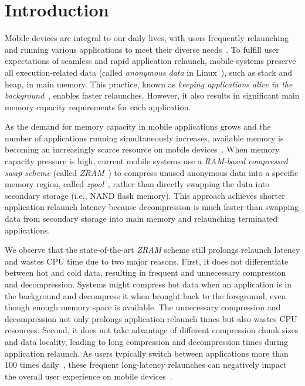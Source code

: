 \section{Introduction}
\label{sec:Intro}
Mobile devices are integral to our daily lives, with users frequently relaunching and running various applications to meet their diverse needs~\cite{lebeck2020end, low-end2, deng2019measuring}. To fulfill user expectations of seamless and rapid application relaunch, mobile systems preserve all execution-related data (called \emph{anonymous data} in Linux~\cite{anonymous}), such as stack and heap, in main memory. This practice, known as \emph{keeping applications alive in the background}~\cite{kim2019ezswap, bergman2022znswap, lebeck2020end, son2021asap, end2024more},
enables faster relaunches. However, it also results in significant main memory capacity requirements for each application. 

As the demand for memory capacity in mobile applications grows and the number of applications running simultaneously increases,  available memory is becoming an increasingly scarce resource on mobile devices~\cite{liang2020acclaim, son2021asap, end2024more, lebeck2020end}.
When memory capacity pressure is high, current mobile systems use a \emph{RAM-based compressed swap scheme} (called \emph{ZRAM}~\cite{zram1,zram2}) to compress unused anonymous data into a specific memory region, called \emph{zpool}~\cite{zpool}, rather than directly swapping the data into secondary storage (i.e., NAND flash memory). This approach achieves shorter application relaunch latency because decompression is much faster than swapping data from secondary storage into main memory and relaunching terminated applications.

We observe that the state-of-the-art \emph{ZRAM} scheme still prolongs relaunch latency and wastes CPU time due to two major reasons. First, it does not differentiate between hot and cold data, resulting in frequent and unnecessary compression and decompression. Systems might compress hot data when an application is in the background and decompress it when brought back to the foreground, even though enough memory space is available. The unnecessary compression and decompression not only prolongs application relaunch times but also wastes CPU resources. Second, it does not take advantage of different compression chunk sizes and data locality, leading to long compression and decompression times during application relaunch. As users typically switch between applications more than 100 times daily~\cite{deng2019measuring}, these frequent long-latency relaunches can negatively impact the overall user experience on mobile devices~\cite{predict1, predict2, predict3, context-aware, ubcomp6, ubcomp21, ubcomp23, ubcomp34, context, predict-privacy1, predict-privacy2, predict-privacy3, mobisysfastapp}.

